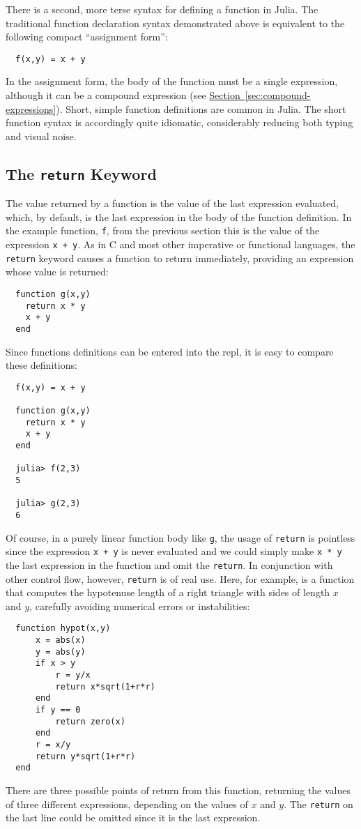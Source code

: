 \documentclass{article}
\renewcommand{\sec}[1]{\label{sec:#1}}
\newcommand{\Section}[1]{\hyperref[sec:#1]{Section~\ref*{sec:#1}}}
\begin{document}
There is a second, more terse syntax for defining a function in Julia.
The traditional function declaration syntax demonstrated above is equivalent to the following compact ``assignment form'':
\begin{verbatim}
  f(x,y) = x + y
\end{verbatim}
In the assignment form, the body of the function must be a single expression, although it can be a compound expression (see \Section{compound-expressions}).
Short, simple function definitions are common in Julia.
The short function syntax is accordingly quite idiomatic, considerably reducing both typing and visual noise.

\subsection{The \texttt{return} Keyword}\sec{the-return-keyword}

The value returned by a function is the value of the last expression evaluated, which, by default, is the last expression in the body of the function definition.
In the example function, \verb|f|, from the previous section this is the value of the expression \verb|x + y|.
As in C and most other imperative or functional languages, the \verb|return| keyword causes a function to return immediately, providing an expression whose value is returned: %
\begin{verbatim}
  function g(x,y)
    return x * y
    x + y
  end
\end{verbatim}
Since functions definitions can be entered into the repl, it is easy to compare these definitions:
\begin{verbatim}
  f(x,y) = x + y

  function g(x,y)
    return x * y
    x + y
  end

  julia> f(2,3)
  5

  julia> g(2,3)
  6
\end{verbatim}
Of course, in a purely linear function body like \verb|g|, the usage of \verb|return| is pointless since the expression \verb|x + y| is never evaluated and we could simply make \verb|x * y| the last expression in the function and omit the \verb|return|.
In conjunction with other control flow, however, \verb|return| is of real use.
Here, for example, is a function that computes the hypotenuse length of a right triangle with sides of length $x$ and $y$, carefully avoiding numerical errors or instabilities:
\begin{verbatim}
  function hypot(x,y)
      x = abs(x)
      y = abs(y)
      if x > y
          r = y/x
          return x*sqrt(1+r*r)
      end
      if y == 0
          return zero(x)
      end
      r = x/y
      return y*sqrt(1+r*r)
  end
\end{verbatim}
There are three possible points of return from this function, returning the values of three different expressions, depending on the values of $x$ and $y$.
The \verb|return| on the last line could be omitted since it is the last expression.
\end{document}
